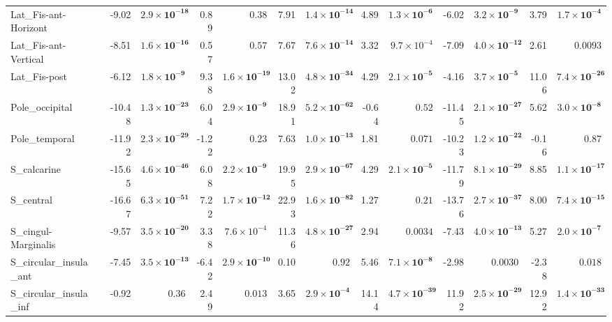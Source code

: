 {\begin{longtable}{llrrrrrrrrrrrr}
Lat\_Fis-ant-Horizont &  & -9.02 & $\mathbf{2.9{\times}10^{-18}}$ & 0.89 & $0.38$ & 7.91 & $\mathbf{1.4{\times}10^{-14}}$ & 4.89 & $\mathbf{1.3{\times}10^{-6}}$ & -6.02 & $\mathbf{3.2{\times}10^{-9}}$ & 3.79 & $\mathbf{1.7{\times}10^{-4}}$ \\
Lat\_Fis-ant-Vertical &  & -8.51 & $\mathbf{1.6{\times}10^{-16}}$ & 0.57 & $0.57$ & 7.67 & $\mathbf{7.6{\times}10^{-14}}$ & 3.32 & $9.7{\times}10^{-4}$ & -7.09 & $\mathbf{4.0{\times}10^{-12}}$ & 2.61 & $0.0093$ \\
Lat\_Fis-post &  & -6.12 & $\mathbf{1.8{\times}10^{-9}}$ & 9.38 & $\mathbf{1.6{\times}10^{-19}}$ & 13.02 & $\mathbf{4.8{\times}10^{-34}}$ & 4.29 & $\mathbf{2.1{\times}10^{-5}}$ & -4.16 & $\mathbf{3.7{\times}10^{-5}}$ & 11.06 & $\mathbf{7.4{\times}10^{-26}}$ \\
Pole\_occipital &  & -10.48 & $\mathbf{1.3{\times}10^{-23}}$ & 6.04 & $\mathbf{2.9{\times}10^{-9}}$ & 18.91 & $\mathbf{5.2{\times}10^{-62}}$ & -0.64 & $0.52$ & -11.45 & $\mathbf{2.1{\times}10^{-27}}$ & 5.62 & $\mathbf{3.0{\times}10^{-8}}$ \\
Pole\_temporal &  & -11.92 & $\mathbf{2.3{\times}10^{-29}}$ & -1.22 & $0.23$ & 7.63 & $\mathbf{1.0{\times}10^{-13}}$ & 1.81 & $0.071$ & -10.23 & $\mathbf{1.2{\times}10^{-22}}$ & -0.16 & $0.87$ \\
S\_calcarine &  & -15.65 & $\mathbf{4.6{\times}10^{-46}}$ & 6.08 & $\mathbf{2.2{\times}10^{-9}}$ & 19.95 & $\mathbf{2.9{\times}10^{-67}}$ & 4.29 & $\mathbf{2.1{\times}10^{-5}}$ & -11.79 & $\mathbf{8.1{\times}10^{-29}}$ & 8.85 & $\mathbf{1.1{\times}10^{-17}}$ \\
S\_central &  & -16.67 & $\mathbf{6.3{\times}10^{-51}}$ & 7.22 & $\mathbf{1.7{\times}10^{-12}}$ & 22.93 & $\mathbf{1.6{\times}10^{-82}}$ & 1.27 & $0.21$ & -13.76 & $\mathbf{2.7{\times}10^{-37}}$ & 8.00 & $\mathbf{7.4{\times}10^{-15}}$ \\
S\_cingul-Marginalis &  & -9.57 & $\mathbf{3.5{\times}10^{-20}}$ & 3.38 & $7.6{\times}10^{-4}$ & 11.36 & $\mathbf{4.8{\times}10^{-27}}$ & 2.94 & $0.0034$ & -7.43 & $\mathbf{4.0{\times}10^{-13}}$ & 5.27 & $\mathbf{2.0{\times}10^{-7}}$ \\
S\_circular\_insula\_ant &  & -7.45 & $\mathbf{3.5{\times}10^{-13}}$ & -6.42 & $\mathbf{2.9{\times}10^{-10}}$ & 0.10 & $0.92$ & 5.46 & $\mathbf{7.1{\times}10^{-8}}$ & -2.98 & $0.0030$ & -2.38 & $0.018$ \\
S\_circular\_insula\_inf &  & -0.92 & $0.36$ & 2.49 & $0.013$ & 3.65 & $\mathbf{2.9{\times}10^{-4}}$ & 14.14 & $\mathbf{4.7{\times}10^{-39}}$ & 11.92 & $\mathbf{2.5{\times}10^{-29}}$ & 12.92 & $\mathbf{1.4{\times}10^{-33}}$ \\

\end{longtable}}
